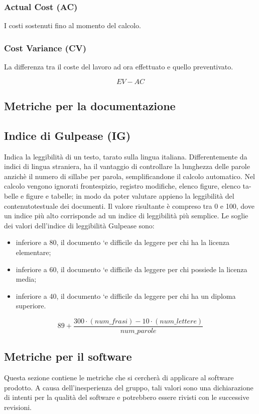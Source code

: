 \subsubsection{Actual Cost (AC)}
I costi sostenuti fino al momento del calcolo.

\subsubsection{Cost Variance (CV)}
La differenza tra il coste del lavoro ad ora effettuato e quello preventivato.

\[
    EV-AC
\]

\subsection{Metriche per la documentazione}

\subsection{Indice di Gulpease (IG)}
Indica la leggibilità di un testo, tarato sulla lingua italiana. Differentemente da indici di lingua straniera, ha il vantaggio di controllare la lunghezza delle parole anzichè il numero di sillabe per parola, semplificandone il calcolo automatico. 
Nel calcolo vengono ignorati frontespizio, registro modifiche, elenco figure, elenco ta-belle e figure e tabelle; in modo da poter valutare appieno la leggibilità del contenutotestuale dei documenti.
Il valore risultante è compreso tra 0 e 100, dove un indice più alto corrisponde ad un indice di leggibilità più semplice.
Le soglie dei valori dell’indice di leggibilità Gulpease sono:
\begin{itemize}
    \item inferiore a 80, il documento `e difficile da leggere per chi ha la licenza elementare;
    \item inferiore a 60, il documento `e difficile da leggere per chi possiede la licenza media;
    \item inferiore a 40, il documento `e difficile da leggere per chi ha un diploma superiore.
\end{itemize}
\[
    89+ \frac{300\cdot (num\_frasi) - 10\cdot (num\_lettere)}{num\_parole}
\]

\subsection{Metriche per il software}
Questa sezione contiene le metriche che si cercherà di applicare al software prodotto. A causa dell’inesperienza del gruppo, tali valori sono una dichiarazione di intenti per la qualità del software e potrebbero essere rivisti con le successive revisioni.

